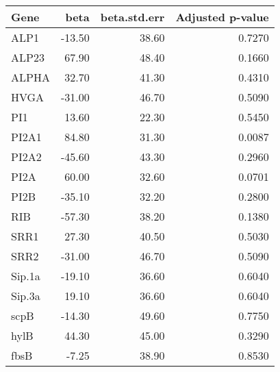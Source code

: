 \begin{table}[ht]
\centering
\begin{tabular}{lrrr}
  \hline
Gene & beta & beta.std.err & Adjusted p-value \\ 
  \hline
ALP1 & -13.50 & 38.60 & 0.7270 \\ 
  ALP23 & 67.90 & 48.40 & 0.1660 \\ 
  ALPHA & 32.70 & 41.30 & 0.4310 \\ 
  HVGA & -31.00 & 46.70 & 0.5090 \\ 
  PI1 & 13.60 & 22.30 & 0.5450 \\ 
  PI2A1 & 84.80 & 31.30 & 0.0087 \\ 
  PI2A2 & -45.60 & 43.30 & 0.2960 \\ 
  PI2A & 60.00 & 32.60 & 0.0701 \\ 
  PI2B & -35.10 & 32.20 & 0.2800 \\ 
  RIB & -57.30 & 38.20 & 0.1380 \\ 
  SRR1 & 27.30 & 40.50 & 0.5030 \\ 
  SRR2 & -31.00 & 46.70 & 0.5090 \\ 
  Sip.1a & -19.10 & 36.60 & 0.6040 \\ 
  Sip.3a & 19.10 & 36.60 & 0.6040 \\ 
  scpB & -14.30 & 49.60 & 0.7750 \\ 
  hylB & 44.30 & 45.00 & 0.3290 \\ 
  fbsB & -7.25 & 38.90 & 0.8530 \\ 
   \hline
\end{tabular}
\end{table}
